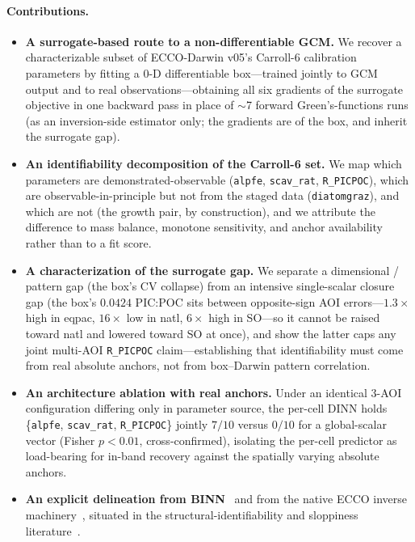 \documentclass[11pt]{article}
\begin{document}
\paragraph{Contributions.}
\begin{itemize}
  \item \textbf{A surrogate-based route to a non-differentiable GCM.} We recover a
    characterizable subset of ECCO-Darwin v05's Carroll-6 calibration parameters
    by fitting a 0-D differentiable box---trained jointly to GCM output and to
    real observations---obtaining all six gradients of the surrogate objective in
    one backward pass in place of $\sim$7 forward Green's-functions runs (as an
    inversion-side estimator only; the gradients are of the box, and inherit the
    surrogate gap).
  \item \textbf{An identifiability decomposition of the Carroll-6 set.} We map
    which parameters are demonstrated-observable (\texttt{alpfe},
    \texttt{scav\_rat}, \texttt{R\_PICPOC}), which are observable-in-principle but
    not from the staged data (\texttt{diatomgraz}), and which are not (the growth
    pair, by construction), and we attribute the difference to mass balance,
    monotone sensitivity, and anchor availability rather than to a fit score.
  \item \textbf{A characterization of the surrogate gap.} We separate a
    dimensional / pattern gap (the box's CV collapse) from an intensive
    single-scalar closure gap (the box's $0.0424$ PIC:POC sits between
    opposite-sign AOI errors---$1.3\times$ high in eqpac, $16\times$ low in natl,
    $6\times$ high in SO---so it cannot be raised toward natl and lowered toward
    SO at once), and show the latter caps any joint multi-AOI \texttt{R\_PICPOC}
    claim---establishing that identifiability must come from real absolute
    anchors, not from box--Darwin pattern correlation.
  \item \textbf{An architecture ablation with real anchors.} Under an
    identical 3-AOI configuration differing only in parameter source, the
    per-cell DINN holds \{\texttt{alpfe}, \texttt{scav\_rat}, \texttt{R\_PICPOC}\}
    jointly $7/10$ versus $0/10$ for a global-scalar vector (Fisher
    $p<0.01$, cross-confirmed), isolating the per-cell predictor as load-bearing
    for in-band recovery against the spatially varying absolute anchors.
  \item \textbf{An explicit delineation from BINN}~\cite{xu2025binn} and from the
    native ECCO inverse machinery~\cite{heimbach2015, menemenlis2005}, situated in
    the structural-identifiability and sloppiness
    literature~\cite{transtrum2012}.
\end{itemize}
\end{document}
